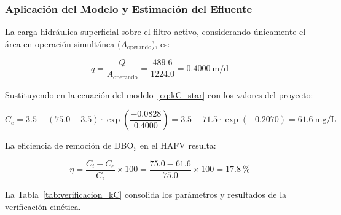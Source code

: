 \documentclass[12pt,a4paper]{article}
\begin{document}
\subsubsection*{Aplicación del Modelo y Estimación del Efluente}

La carga hidráulica superficial sobre el filtro activo, considerando únicamente el área en operación simultánea ($A_\text{operando}$), es:

\begin{equation}
q = \frac{Q}{A_\text{operando}} = \frac{489.6}{1224.0} = 0.4000\ \text{m/d}
\end{equation}

Sustituyendo en la ecuación del modelo~\eqref{eq:kC_star} con los valores del proyecto:

\begin{equation}
C_e = 3.5 + (75.0 - 3.5) \cdot \exp\!\left(\frac{-0.0828}{0.4000}\right) = 3.5 + 71.5 \cdot \exp(-0.2070) = 61.6\ \text{mg/L}
\end{equation}

La eficiencia de remoción de DBO$_5$ en el HAFV resulta:

\begin{equation}
\eta = \frac{C_i - C_e}{C_i} \times 100 = \frac{75.0 - 61.6}{75.0} \times 100 = 17.8\ \%
\end{equation}

La Tabla~\ref{tab:verificacion_kC} consolida los parámetros y resultados de la verificación cinética.
\end{document}
